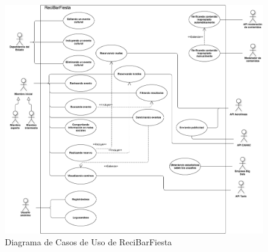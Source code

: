 \begin{figure}[H]
 \centering
  \includegraphics[width=\textwidth]{diagramas/casosDeUso.png}
  \caption{Diagrama de Casos de Uso de ReciBarFiesta}
  \label{fig:cu}
\end{figure}

